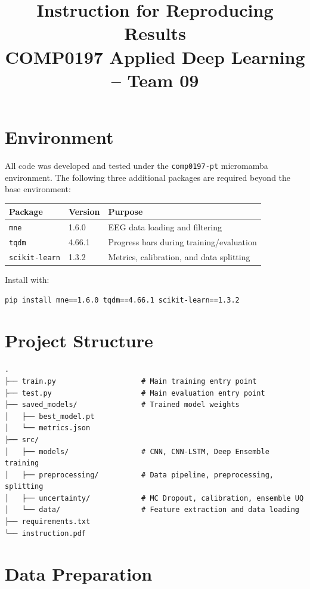 \documentclass[11pt]{article}
\title{Instruction for Reproducing Results\\[4pt]
\large COMP0197 Applied Deep Learning -- Team 09}
\author{}
\date{}
\begin{document}
\maketitle

\section{Environment}

All code was developed and tested under the \texttt{comp0197-pt} micromamba environment. The following three additional packages are required beyond the base environment:

\begin{table}[h]
\centering
\begin{tabular}{lll}
\toprule
Package & Version & Purpose \\
\midrule
\texttt{mne} & 1.6.0 & EEG data loading and filtering \\
\texttt{tqdm} & 4.66.1 & Progress bars during training/evaluation \\
\texttt{scikit-learn} & 1.3.2 & Metrics, calibration, and data splitting \\
\bottomrule
\end{tabular}
\end{table}

\noindent Install with:
\begin{verbatim}
pip install mne==1.6.0 tqdm==4.66.1 scikit-learn==1.3.2
\end{verbatim}

\section{Project Structure}

\begin{verbatim}
.
├── train.py                    # Main training entry point
├── test.py                     # Main evaluation entry point
├── saved_models/               # Trained model weights
│   ├── best_model.pt
│   └── metrics.json
├── src/
│   ├── models/                 # CNN, CNN-LSTM, Deep Ensemble training
│   ├── preprocessing/          # Data pipeline, preprocessing, splitting
│   ├── uncertainty/            # MC Dropout, calibration, ensemble UQ
│   └── data/                   # Feature extraction and data loading
├── requirements.txt
└── instruction.pdf
\end{verbatim}

\section{Data Preparation}
\end{document}
